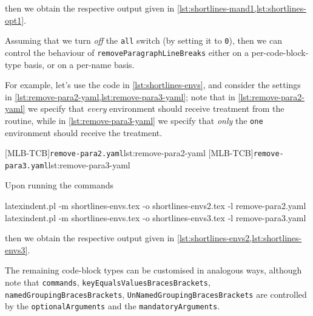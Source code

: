 	then we obtain the respective output given in \cref{lst:shortlines-mand1,lst:shortlines-opt1}.


	Assuming that we turn \emph{off} the \texttt{all} switch
	(by setting it to \texttt{0}), then we can control the behaviour of
	\texttt{removeParagraphLineBreaks} either on a per-code-block-type basis, or on a per-name
	basis.

	For example, let's use the code in \cref{lst:shortlines-envs}, and consider the settings
	in \cref{lst:remove-para2-yaml,lst:remove-para3-yaml}; note that in \cref{lst:remove-para2-yaml} we specify that
	\emph{every} environment should receive treatment from the routine, while
	in \cref{lst:remove-para3-yaml} we specify that \emph{only} the
	\texttt{one} environment should receive the treatment.

	\begin{minipage}{.45\linewidth}
	\end{minipage}
	\hfill
	\begin{minipage}{.49\linewidth}
		[MLB-TCB]{\texttt{remove-para2.yaml}}{lst:remove-para2-yaml}
		[MLB-TCB]{\texttt{remove-para3.yaml}}{lst:remove-para3-yaml}
	\end{minipage}

	Upon running the commands
	\begin{widepage}
		\begin{commandshell}
latexindent.pl -m shortlines-envs.tex -o shortlines-envs2.tex -l remove-para2.yaml
latexindent.pl -m shortlines-envs.tex -o shortlines-envs3.tex -l remove-para3.yaml
\end{commandshell}
	\end{widepage}
	then we obtain the respective output given in \cref{lst:shortlines-envs2,lst:shortlines-envs3}.


	The remaining code-block types can be customised in analogous ways, although note that
	\texttt{commands}, \texttt{keyEqualsValuesBracesBrackets}, \texttt{namedGroupingBracesBrackets},
	\texttt{UnNamedGroupingBracesBrackets} are controlled by the \texttt{optionalArguments} and the
	\texttt{mandatoryArguments}.

